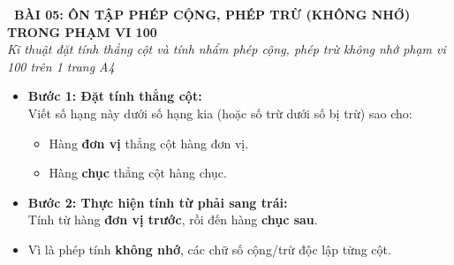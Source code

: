 \documentclass[11pt,a4paper]{article}
\begin{document}
\begin{tcolorbox}[
  enhanced,
  colback=violet!8!white,
  colframe=violet!70!black,
  arc=3mm, boxrule=1.2pt,
  left=3mm, right=3mm, top=2mm, bottom=2mm,
  halign=center
]
  {\LARGE\bfseries\color{violet!90!black}\faBookmark\ BÀI 05: ÔN TẬP PHÉP CỘNG, PHÉP TRỪ (KHÔNG NHỚ) TRONG PHẠM VI 100}\\[1mm]
  {\itshape\footnotesize\color{black!75} Kĩ thuật đặt tính thẳng cột và tính nhẩm phép cộng, phép trừ không nhớ phạm vi 100 trên 1 trang A4}
\end{tcolorbox}

\vspace{-2mm}

\noindent
\begin{minipage}[t]{0.49\textwidth}\vspace{0pt}
\begin{tcolorbox}[
  enhanced,
  colback=violet!4!white,
  colframe=violet!75!black,
  arc=2mm, boxrule=0.8pt,
  left=2mm, right=2mm, top=1.8mm, bottom=1.8mm,
  title={\footnotesize\bfseries\color{white}\faKey\ 1. Quy tắc đặt tính rồi tính}
]
{\footnotesize
\begin{itemize}\setlength{\itemsep}{1pt}\setlength{\leftskip}{-2.5mm}
  \item \textbf{Bước 1: Đặt tính thẳng cột:}\\
  Viết số hạng này dưới số hạng kia (hoặc số trừ dưới số bị trừ) sao cho:
  \begin{itemize}\setlength{\itemsep}{0.5pt}\setlength{\leftskip}{-2.5mm}
    \item Hàng \textbf{đơn vị} thẳng cột hàng đơn vị.
    \item Hàng \textbf{chục} thẳng cột hàng chục.
  \end{itemize}
  \item \textbf{Bước 2: Thực hiện tính từ phải sang trái:}\\
  Tính từ hàng \textbf{đơn vị trước}, rồi đến hàng \textbf{chục sau}.
  \item Vì là phép tính \textbf{không nhớ}, các chữ số cộng/trừ độc lập từng cột.
\end{itemize}
}
\end{tcolorbox}
\end{minipage}
\hfill
\end{document}

